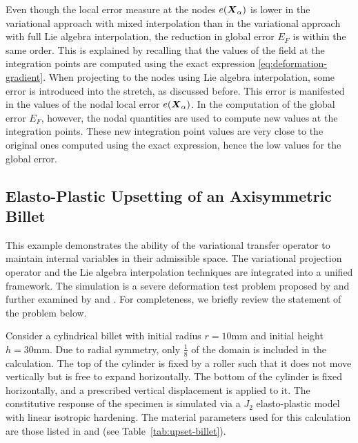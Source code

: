 \documentclass[12pt]{article}
\begin{document}
Even though the local error measure at the nodes $e({\boldsymbol{X}}_{\alpha})$ is
lower in the variational approach with mixed interpolation than in the
variational approach with full Lie algebra interpolation, the
reduction in global error $E_{F}$ is within the same order. This is
explained by recalling that the values of the field at the integration
points are computed using the exact expression
\eqref{eq:deformation-gradient}. When projecting to the nodes using
Lie algebra interpolation, some error is introduced into the stretch,
as discussed before. This error is manifested in the values of the
nodal local error $e({\boldsymbol{X}}_{\alpha})$. In the computation of the global
error $E_F$, however, the nodal quantities are used to compute new
values at the integration points. These new integration point values
are very close to the original ones computed using the exact
expression, hence the low values for the global error.


\subsection{Elasto-Plastic Upsetting of an Axisymmetric Billet}

This example demonstrates the ability of the variational transfer operator to
maintain internal variables in their admissible space. The variational
projection operator and the Lie algebra interpolation techniques are integrated
into a unified framework. The simulation is a severe deformation test problem
proposed by \citet{Krieg.Krieg:1977} and further examined by
\citet{Taylor.Becker:1983} and \citet{Simo.Hughes:1998}. For completeness, we
briefly review the statement of the problem below.

Consider a cylindrical billet with initial radius $r = 10\text{mm}$
and initial height $h = 30\text{mm}$. Due to radial symmetry, only
$\frac{1}{8}$ of the domain is included in the calculation. The top of
the cylinder is fixed by a roller such that it does not move
vertically but is free to expand horizontally. The bottom of the
cylinder is fixed horizontally, and a prescribed vertical displacement
is applied to it.  The constitutive response of the specimen is
simulated via a $J_2$ elasto-plastic model with linear isotropic
hardening. The material parameters used for this calculation are those
listed in \citet{Taylor.Becker:1983} and \citet{Simo.Hughes:1998} (see
Table~\ref{tab:upset-billet}).
\end{document}
